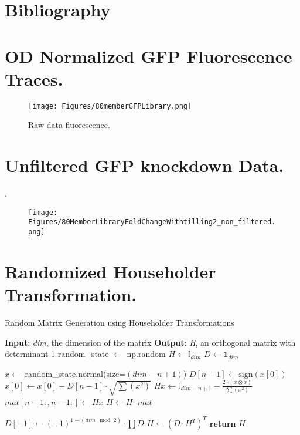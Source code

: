 \documentclass[times]{zHenriquesLab-StyleBioRxiv}
\begin{document}
\begin{acknowledgements}
\blindtext
\end{acknowledgements}

\section*{Bibliography}


\clearpage
\section{OD Normalized GFP Fluorescence Traces.}

\begin{figure}[ht]
    \centering   
    \texttt{[image: Figures/80memberGFPLibrary.png]}
    \caption{Raw data fluorescence.}
    \label{supfig:1}
\end{figure}

\clearpage

\section{Unfiltered GFP knockdown Data.}.
\begin{figure}[ht!]
    \centering   
    \texttt{[image: Figures/80MemberLibraryFoldChangeWithtilling2\_non\_filtered.png]}
    \label{supfig:2}
\end{figure}

\clearpage

\section{Randomized Householder Transformation.}

\begin{algorithm}
    \caption{Random Matrix Generation using Householder Transformations}
    \begin{algorithmic}
        \State \textbf{Input}: \textit{dim}, the dimension of the matrix
        \State \textbf{Output}: \textit{H}, an orthogonal matrix with determinant 1
        \State random\_state $\gets$ np.random
        \State $H \gets \mathbb{I}_{dim}$ 
        \State $D \gets \mathbf{1}_{dim}$ 
        
            \State $x \gets$ random\_state.normal(size=$(dim-n+1)$)
            \State $D[n-1] \gets \text{sign}(x[0])$
            \State $x[0] \gets x[0] - D[n-1] \cdot \sqrt{\sum (x^2)}$
            \State $Hx \gets \mathbb{I}_{dim-n+1} - \frac{2 \cdot (x \otimes x)}{\sum (x^2)}$ 
            \State $mat[n-1:, n-1:] \gets Hx$
            \State $H \gets H \cdot mat$
        \EndFor
        
        \State $D[-1] \gets (-1)^{1 - (dim \mod 2)} \cdot \prod D$ 
        \State $H \gets (D \cdot H^T)^T$ 
        \State \textbf{return} $H$
    \end{algorithmic}
\end{algorithm}
\end{document}
